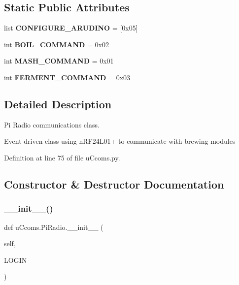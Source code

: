 \subsection*{Static Public Attributes}
\begin{DoxyCompactItemize}
\item 
\mbox{\label{classu_ccoms_1_1_pi_radio_a5fd5c79bb8627fbefc2dc07367dfa777}} 
list {\bfseries C\+O\+N\+F\+I\+G\+U\+R\+E\+\_\+\+A\+R\+U\+D\+I\+NO} = \mbox{[}0x05\mbox{]}
\item 
\mbox{\label{classu_ccoms_1_1_pi_radio_aa5b916329cbebfd52d6399fff11c44b4}} 
int {\bfseries B\+O\+I\+L\+\_\+\+C\+O\+M\+M\+A\+ND} = 0x02
\item 
\mbox{\label{classu_ccoms_1_1_pi_radio_a9eb91b743a9baace636c7e5a28910641}} 
int {\bfseries M\+A\+S\+H\+\_\+\+C\+O\+M\+M\+A\+ND} = 0x01
\item 
\mbox{\label{classu_ccoms_1_1_pi_radio_aa60c3a94afeab931f5d320aacbecabdd}} 
int {\bfseries F\+E\+R\+M\+E\+N\+T\+\_\+\+C\+O\+M\+M\+A\+ND} = 0x03
\end{DoxyCompactItemize}


\subsection{Detailed Description}
Pi Radio communications class. 

Event driven class using n\+R\+F24\+L01+ to communicate with brewing modules 

Definition at line 75 of file u\+Ccoms.\+py.



\subsection{Constructor \& Destructor Documentation}
\mbox{\label{classu_ccoms_1_1_pi_radio_ae0022ce300195d9fd5de907e925ec739}} 
\subsubsection{\texorpdfstring{\_\_init\_\_()}{\_\_init\_\_()}}
{\footnotesize\ttfamily def u\+Ccoms.\+Pi\+Radio.\+\_\+\+\_\+init\+\_\+\+\_\+ (\begin{DoxyParamCaption}\item[{}]{self,  }\item[{}]{L\+O\+G\+IN }\end{DoxyParamCaption})}



